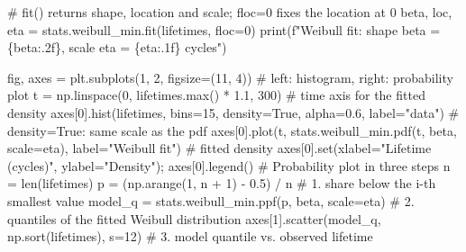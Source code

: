 \documentclass[
  letterpaper,
  DIV=11,
  numbers=noendperiod]{scrreprt}
\newenvironment{Shaded}{\begin{snugshade}}{\end{snugshade}}
\newcommand{\BuiltInTok}[1]{\textcolor[rgb]{0.00,0.23,0.31}{#1}}
\newcommand{\CommentTok}[1]{\textcolor[rgb]{0.37,0.37,0.37}{#1}}
\newcommand{\DecValTok}[1]{\textcolor[rgb]{0.68,0.00,0.00}{#1}}
\newcommand{\FloatTok}[1]{\textcolor[rgb]{0.68,0.00,0.00}{#1}}
\newcommand{\NormalTok}[1]{\textcolor[rgb]{0.00,0.23,0.31}{#1}}
\newcommand{\OperatorTok}[1]{\textcolor[rgb]{0.37,0.37,0.37}{#1}}
\newcommand{\SpecialCharTok}[1]{\textcolor[rgb]{0.37,0.37,0.37}{#1}}
\newcommand{\SpecialStringTok}[1]{\textcolor[rgb]{0.13,0.47,0.30}{#1}}
\newcommand{\StringTok}[1]{\textcolor[rgb]{0.13,0.47,0.30}{#1}}
\newcommand{\VariableTok}[1]{\textcolor[rgb]{0.07,0.07,0.07}{#1}}
\begin{document}
\begin{Shaded}
\begin{Highlighting}[]
\CommentTok{\# fit() returns shape, location and scale; floc=0 fixes the location at 0}
\NormalTok{beta, loc, eta }\OperatorTok{=}\NormalTok{ stats.weibull\_min.fit(lifetimes, floc}\OperatorTok{=}\DecValTok{0}\NormalTok{)}
\BuiltInTok{print}\NormalTok{(}\SpecialStringTok{f"Weibull fit: shape beta = }\SpecialCharTok{\{}\NormalTok{beta}\SpecialCharTok{:.2f\}}\SpecialStringTok{, scale eta = }\SpecialCharTok{\{}\NormalTok{eta}\SpecialCharTok{:.1f\}}\SpecialStringTok{ cycles"}\NormalTok{)}

\NormalTok{fig, axes }\OperatorTok{=}\NormalTok{ plt.subplots(}\DecValTok{1}\NormalTok{, }\DecValTok{2}\NormalTok{, figsize}\OperatorTok{=}\NormalTok{(}\DecValTok{11}\NormalTok{, }\DecValTok{4}\NormalTok{))       }\CommentTok{\# left: histogram, right: probability plot}
\NormalTok{t }\OperatorTok{=}\NormalTok{ np.linspace(}\DecValTok{0}\NormalTok{, lifetimes.}\BuiltInTok{max}\NormalTok{() }\OperatorTok{*} \FloatTok{1.1}\NormalTok{, }\DecValTok{300}\NormalTok{)        }\CommentTok{\# time axis for the fitted density}
\NormalTok{axes[}\DecValTok{0}\NormalTok{].hist(lifetimes, bins}\OperatorTok{=}\DecValTok{15}\NormalTok{, density}\OperatorTok{=}\VariableTok{True}\NormalTok{, alpha}\OperatorTok{=}\FloatTok{0.6}\NormalTok{, label}\OperatorTok{=}\StringTok{"data"}\NormalTok{)  }\CommentTok{\# density=True: same scale as the pdf}
\NormalTok{axes[}\DecValTok{0}\NormalTok{].plot(t, stats.weibull\_min.pdf(t, beta, scale}\OperatorTok{=}\NormalTok{eta), label}\OperatorTok{=}\StringTok{"Weibull fit"}\NormalTok{)  }\CommentTok{\# fitted density}
\NormalTok{axes[}\DecValTok{0}\NormalTok{].}\BuiltInTok{set}\NormalTok{(xlabel}\OperatorTok{=}\StringTok{"Lifetime (cycles)"}\NormalTok{, ylabel}\OperatorTok{=}\StringTok{"Density"}\NormalTok{)}\OperatorTok{;}\NormalTok{ axes[}\DecValTok{0}\NormalTok{].legend()}
\CommentTok{\# Probability plot in three steps}
\NormalTok{n }\OperatorTok{=} \BuiltInTok{len}\NormalTok{(lifetimes)}
\NormalTok{p }\OperatorTok{=}\NormalTok{ (np.arange(}\DecValTok{1}\NormalTok{, n }\OperatorTok{+} \DecValTok{1}\NormalTok{) }\OperatorTok{{-}} \FloatTok{0.5}\NormalTok{) }\OperatorTok{/}\NormalTok{ n                   }\CommentTok{\# 1. share below the i{-}th smallest value}
\NormalTok{model\_q }\OperatorTok{=}\NormalTok{ stats.weibull\_min.ppf(p, beta, scale}\OperatorTok{=}\NormalTok{eta)   }\CommentTok{\# 2. quantiles of the fitted Weibull distribution}
\NormalTok{axes[}\DecValTok{1}\NormalTok{].scatter(model\_q, np.sort(lifetimes), s}\OperatorTok{=}\DecValTok{12}\NormalTok{)    }\CommentTok{\# 3. model quantile vs. observed lifetime}

\end{Highlighting}
\end{Shaded}
\end{document}
